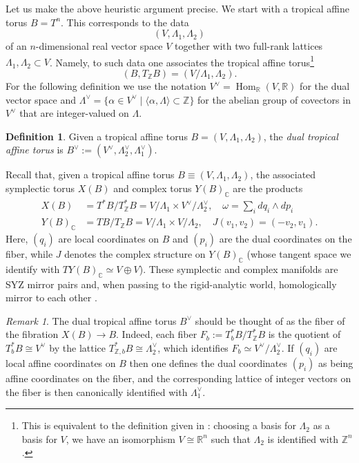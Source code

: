 \documentclass[10pt]{amsart}
\theoremstyle{definition}
\newtheorem{definition}[thm]{Definition}
\theoremstyle{remark}
\newtheorem{rmk}[thm]{Remark}
\def\C{\mathbb{C}}
\def\R{\mathbb{R}}
\def\Z{\mathbb{Z}}
\DeclareMathOperator{\Hom}{Hom}
\newcommand{\wdg}{\wedge}
\def\x{\times}
\begin{document}
Let us make the above heuristic argument  precise.
We start with  a tropical affine torus $B = T^n$.
This corresponds to the data
$$
(V,\Lambda_1,\Lambda_2)
$$ 
of an $n$-dimensional real vector space $V$ together with two full-rank lattices $\Lambda_1, \Lambda_2 \subset V$.
Namely, to such data one associates the tropical affine torus\footnote{This is equivalent to the definition given in : choosing a basis for  $\Lambda_2$ as a basis for $V$, we have an isomorphism $V \cong \R^n$ such that $\Lambda_2$ is identified with $\Z^n$.}
$$
(B,T_\Z B)  = (V/\Lambda_1, \Lambda_2).
$$
For the following definition we use the notation $V^\vee = \Hom_\R(V,\R)$ for the dual vector space and $\Lambda^\vee = \{\alpha \in V^\vee \mid \langle \alpha,\Lambda \rangle \subset \Z\}$ for the abelian group of covectors in $V^\vee$ that are integer-valued on $\Lambda$.
\begin{definition}\label{def:dualtropicalaffinetorus}
    Given a tropical affine torus $B = (V,\Lambda_1,\Lambda_2)$, the \emph{dual tropical affine torus} is $B^\vee := (V^\vee,\Lambda_2^\vee,\Lambda_1^\vee)$.
\end{definition}

Recall that, given a tropical affine torus $B \equiv (V,\Lambda_1,\Lambda_2)$, the associated symplectic torus $X(B)$ and complex torus $Y(B)_\C$ are the products
\begin{align}
    X(B) &= T^*B / T^*_\Z B = V/\Lambda_1 \x V^\vee/\Lambda_2^\vee,\quad \omega = \sum_i dq_i \wdg dp_i \label{eq:X(B)}\\
    Y(B)_\C &= TB/T_\Z B = V/\Lambda_1 \x V/\Lambda_2,\quad J(v_1,v_2) = (-v_2,v_1).\label{eq:Y(B)}
\end{align}
Here, $(q_i)$ are local coordinates on $B$ and $(p_i)$ are the dual coordinates on the fiber, while $J$ denotes the complex structure on $Y(B)_\C$ (whose tangent space we identify with $TY(B)_\C \simeq V \oplus V$).
These symplectic and complex manifolds are SYZ mirror pairs and, when passing to the rigid-analytic world, homologically mirror to each other \cite{kontsevich2001homological,fukaya2002mirror,abouzaid2021homological}.

\begin{rmk}\label{rmk:dualtorusisfiber}
    The dual tropical affine torus $B^\vee$ should be thought of as the fiber of the fibration $X(B) \to B$.
    Indeed, each fiber $F_b := T^*_b B /T^*_\Z B$ is the quotient of $T^*_bB \cong V^\vee$ by the lattice $T^*_{\Z,b} B \cong \Lambda_2^\vee$, which identifies $F_b \simeq V^\vee/\Lambda_2^\vee$.
    If $(q_i)$ are local affine coordinates on $B$ then one defines the dual coordinates $(p_i)$ as being affine coordinates on the fiber, and the corresponding lattice of integer vectors on the fiber is then canonically identified with $\Lambda_1^\vee$.
\end{rmk}
\end{document}
